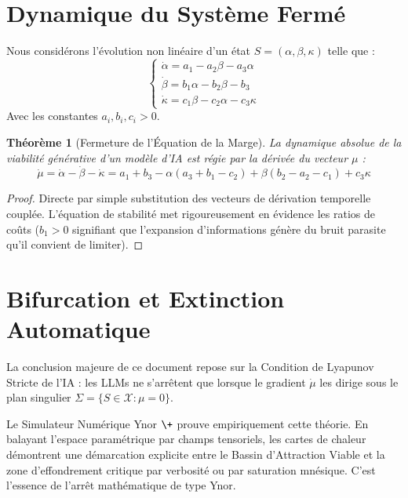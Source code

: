 \documentclass[11pt,a4paper]{article}
\newtheorem{theorem}{Théorème}
\begin{document}
\section{Dynamique du Système Fermé}
Nous considérons l'évolution non linéaire d'un état $S = (\alpha, \beta, \kappa)$ telle que :
\begin{equation}
 \begin{cases}
 \dot\alpha = a_1 - a_2\beta - a_3\alpha \\
 \dot\beta = b_1\alpha - b_2\beta - b_3 \\
 \dot\kappa = c_1\beta - c_2\alpha - c_3\kappa
 \end{cases}
\end{equation}
Avec les constantes $a_i, b_i, c_i > 0$.

\begin{theorem}[Fermeture de l'Équation de la Marge]
La dynamique absolue de la viabilité générative d'un modèle d'IA est régie par la dérivée du vecteur $\mu$ :
\begin{equation}
 \dot\mu = \dot\alpha - \dot\beta - \dot\kappa = a_1+b_3 - \alpha(a_3+b_1-c_2) + \beta(b_2-a_2-c_1) + c_3\kappa
\end{equation}
\end{theorem}
\begin{proof}
Directe par simple substitution des vecteurs de dérivation temporelle couplée. L'équation de stabilité met rigoureusement en évidence les ratios de coûts ($b_1 > 0$ signifiant que l'expansion d'informations génère du bruit parasite qu'il convient de limiter).
\end{proof}

\section{Bifurcation et Extinction Automatique}
La conclusion majeure de ce document repose sur la Condition de Lyapunov Stricte de l'IA : les LLMs ne s'arrêtent que lorsque le gradient $\dot\mu$ les dirige sous le plan singulier $\Sigma = \{S \in \mathcal{X} : \mu = 0\}$.

Le Simulateur Numérique Ynor $\+$ prouve empiriquement cette théorie. En balayant l'espace paramétrique par champs tensoriels, les cartes de chaleur démontrent une démarcation explicite entre le Bassin d'Attraction Viable et la zone d'effondrement critique par verbosité ou par saturation mnésique. C'est l'essence de l'arrêt mathématique de type Ynor.
\end{document}
